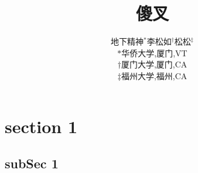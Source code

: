 \documentclass[12pt]{article}
\title{傻叉}
\author{地下精神$^*$\quad 李松如$^\dagger$\quad 松松$^\ddagger$\\[10pt]
$*$华侨大学,厦门,VT\\
$\dagger$厦门大学,厦门,CA\\
$\ddagger$福州大学,福州,CA}
\date{}
\begin{document}
    \maketitle
    
    \tableofcontents
    \listoffigures
    \listoftables
    
%

    
    \section{section 1}
        \subsection*{subSec 1}  %
        
\end{document}
